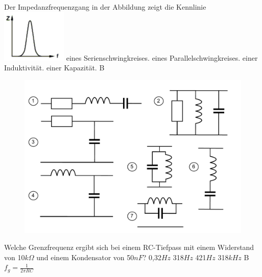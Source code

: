 \vspace*{0.65cm}

{Der Impedanzfrequenzgang in der Abbildung zeigt die Kennlinie\\
\includegraphics[scale=0.5]{Schwingkreis/Bilder/TD202.png}}%
{eines Serienschwingkreises.}%
{eines Parallelschwingkreises.}%
{einer Induktivität.}%
{einer Kapazität.}
{B}%


\begin{figure}[H]
	\centering
	\includegraphics[scale=0.5]{Schwingkreis/Bilder/Filterschaltungen.pdf}
	\end{figure}

{Welche Grenzfrequenz ergibt sich bei einem RC-Tiefpass mit einem Widerstand von 10$k\Omega$ und einem Kondensator von 50$nF$?}%
{0,32$Hz$}%
{318$Hz$}%
{421$Hz$}%
{318$kHz$}%
{B \hspace{3em} $f_g = \frac{1}{2 \pi R C}$}%

